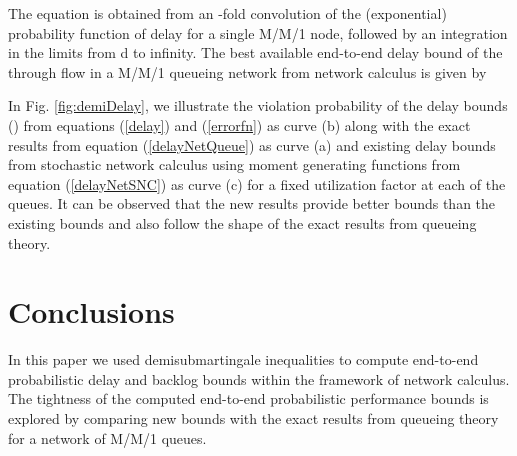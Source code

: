 \documentclass[letterpaper]{IEEEtran}
\begin{document}
\normalsize
The equation is obtained from an -fold convolution of the (exponential) probability function of delay for a single M/M/1 node, followed by an integration in the limits from d to infinity.
The best available end-to-end delay bound of the through flow  in a M/M/1 queueing network from network calculus \cite{florin:2007-1,fidler:2006} is given by
\small

\normalsize
In Fig. \ref{fig:demiDelay}, we illustrate the violation probability of the delay bounds () from equations (\ref{delay}) and (\ref{errorfn}) as curve (b) along with the exact results from equation (\ref{delayNetQueue}) as curve (a) and existing delay bounds from stochastic network calculus using moment generating functions \cite{fidler:2006,florin:2007-1} from equation (\ref{delayNetSNC}) as curve (c) for a fixed utilization factor  at each of the  queues. It can be observed that the new results provide better bounds than the existing bounds and also follow the shape of the exact results from queueing theory. 





\section{Conclusions}
\label{sec:conclusion}
In this paper we used demisubmartingale inequalities to compute end-to-end probabilistic delay and backlog bounds within the framework of network calculus. The tightness of the computed end-to-end probabilistic performance bounds is explored by comparing new bounds with the exact results from queueing theory for a network of M/M/1 queues.


\end{document}
